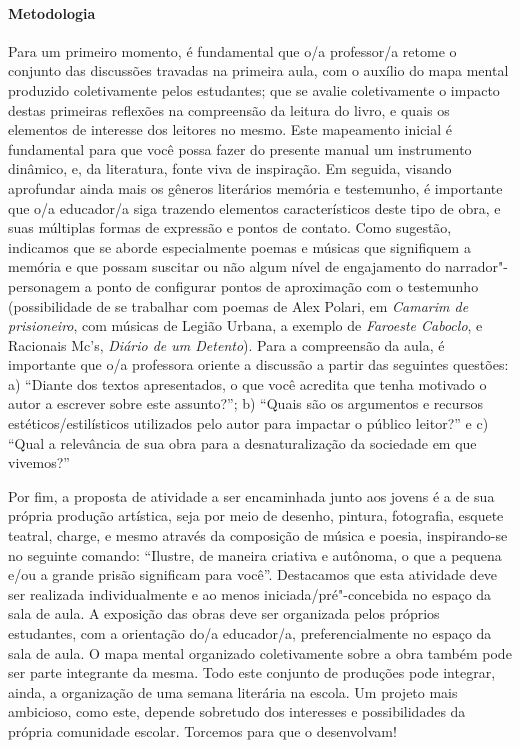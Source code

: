 \documentclass[11pt]{extarticle}
\begin{document}
\paragraph{Metodologia} Para um primeiro momento, é fundamental que o/a
professor/a retome o conjunto das discussões travadas na primeira aula,
com o auxílio do mapa mental produzido coletivamente pelos estudantes;
que se avalie coletivamente o impacto destas primeiras reflexões na
compreensão da leitura do livro, e quais os elementos de interesse dos
leitores no mesmo. Este mapeamento inicial é fundamental para que você
possa fazer do presente manual um instrumento dinâmico, e, da literatura,
fonte viva de inspiração. Em seguida, visando aprofundar ainda mais os
gêneros literários memória e testemunho, é importante que o/a educador/a
siga trazendo elementos característicos deste tipo de obra, e suas
múltiplas formas de expressão e pontos de contato. Como sugestão,
indicamos que se aborde especialmente poemas e músicas que signifiquem a
memória e que possam suscitar ou não algum nível de engajamento do
narrador"-personagem a ponto de configurar pontos de aproximação com o
testemunho (possibilidade de se trabalhar com poemas de Alex Polari, em
\emph{Camarim de prisioneiro}, com músicas de Legião Urbana, a exemplo
de \emph{Faroeste Caboclo}, e Racionais Mc's, \emph{Diário de um
Detento}). Para a compreensão da aula, é importante que o/a professora
oriente a discussão a partir das seguintes questões: a) ``Diante dos textos apresentados, o que você
acredita que tenha motivado o autor a escrever sobre este assunto?''; b)
``Quais são os argumentos e recursos estéticos/estilísticos utilizados
pelo autor para impactar o público leitor?'' e c) ``Qual a relevância de sua
obra para a desnaturalização da sociedade em que vivemos?''

Por fim, a proposta de atividade a ser encaminhada junto aos jovens é a
de sua própria produção artística, seja por meio de desenho, pintura,
fotografia, esquete teatral, charge, e mesmo através da composição de
música e poesia, inspirando-se no seguinte comando: ``Ilustre, de maneira
criativa e autônoma, o que a pequena e/ou a grande prisão significam para
você''. Destacamos que esta atividade deve ser realizada individualmente e
ao menos iniciada/pré"-concebida no espaço da sala de aula. A exposição
das obras deve ser organizada pelos próprios estudantes, com a
orientação do/a educador/a, preferencialmente no espaço da sala de aula.
O mapa mental organizado coletivamente sobre a obra também pode ser
parte integrante da mesma. Todo este conjunto de produções pode
integrar, ainda, a organização de uma semana literária na escola. Um
projeto mais ambicioso, como este, depende sobretudo dos interesses e
possibilidades da própria comunidade escolar. Torcemos para que o
desenvolvam!
\end{document}
